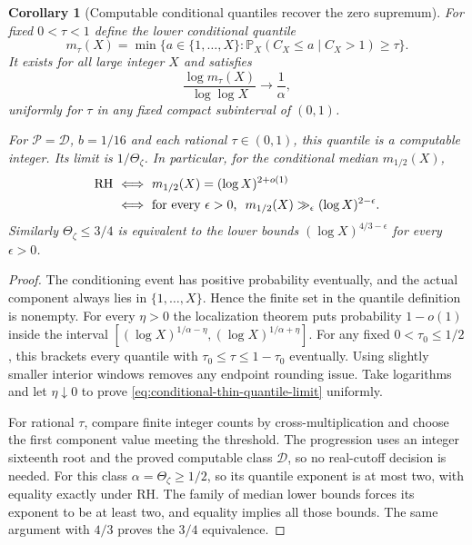 \documentclass[11pt]{article}
\newtheorem{corollary}[theorem]{Corollary}
\theoremstyle{definition}
\begin{document}
\begin{corollary}[Computable conditional quantiles recover the zero supremum]
\label{cor:conditional-thin-quantile-RH}
For fixed $0<\tau<1$ define the lower conditional quantile
\begin{equation}
 m_\tau(X)=
 \min\{a\in\{1,\ldots,X\}:
       \mathbb P_X(C_X\le a\mid C_X>1)\ge\tau\}.
 \label{eq:conditional-thin-quantile}
\end{equation}
It exists for all large integer $X$ and satisfies
\begin{equation}
 \frac{\log m_\tau(X)}{\log\log X}\longrightarrow\frac1\alpha,
 \label{eq:conditional-thin-quantile-limit}
\end{equation}
uniformly for $\tau$ in any fixed compact subinterval of $(0,1)$.

For $\mathcal P=\mathcal D$, $b=1/16$ and each rational
$\tau\in(0,1)$, this quantile is a computable integer.
Its limit is $1/\Theta_\zeta$.
In particular, for the conditional median $m_{1/2}(X)$,
\begin{equation}
 \begin{aligned}
 {\rm RH}
 &\ \Longleftrightarrow\
       m_{1/2}(X)=(\log X)^{2+o(1)}\\
 &\ \Longleftrightarrow\
       \text{for every $\epsilon>0$, }\
       m_{1/2}(X)\gg_\epsilon(\log X)^{2-\epsilon}.
 \end{aligned}
 \label{eq:conditional-thin-median-RH}
\end{equation}
Similarly $\Theta_\zeta\le3/4$ is equivalent to the
lower bounds $(\log X)^{4/3-\epsilon}$ for every $\epsilon>0$.
\end{corollary}

\begin{proof}
The conditioning event has positive probability eventually,
and the actual component always lies in $\{1,\ldots,X\}$.
Hence the finite set in the quantile definition is nonempty.
For every $\eta>0$ the localization theorem puts probability
$1-o(1)$ inside the interval
$[(\log X)^{1/\alpha-\eta},(\log X)^{1/\alpha+\eta}]$.
For any fixed $0<\tau_0\le1/2$, this brackets every quantile
with $\tau_0\le\tau\le1-\tau_0$ eventually.
Using slightly smaller interior windows removes any endpoint
rounding issue.  Take logarithms and let $\eta\downarrow0$
to prove \eqref{eq:conditional-thin-quantile-limit} uniformly.

For rational $\tau$, compare finite integer counts by
cross-multiplication and choose the first component value
meeting the threshold.  The progression uses an integer
sixteenth root and the proved computable class $\mathcal D$,
so no real-cutoff decision is needed.
For this class $\alpha=\Theta_\zeta\ge1/2$, so its quantile
exponent is at most two, with equality exactly under RH.
The family of median lower bounds forces its exponent to
be at least two, and equality implies all those bounds.
The same argument with $4/3$ proves the $3/4$ equivalence.
\end{proof}
\end{document}
